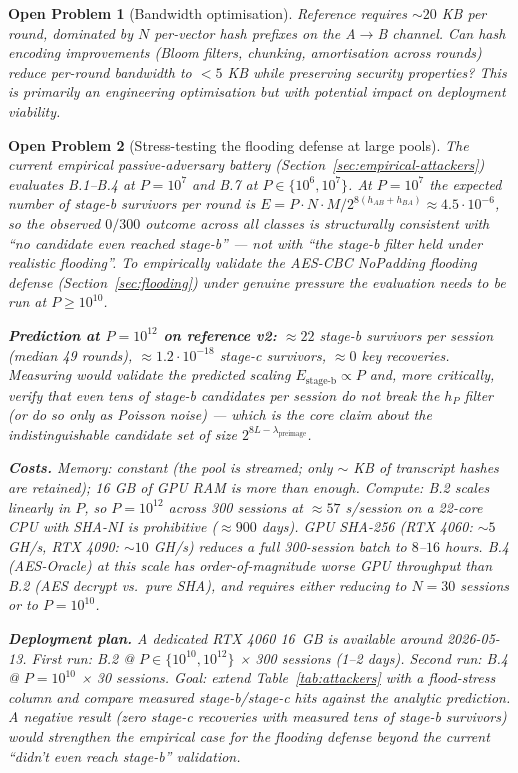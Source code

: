 \documentclass[11pt,a4paper]{article}
\newtheorem{openproblem}{Open Problem}
\begin{document}
\begin{openproblem}[Bandwidth optimisation]\label{prob:bandwidth}
Reference requires $\sim 20$ KB per round, dominated by $N$ per-vector hash prefixes on the A$\to$B channel. Can hash encoding improvements (Bloom filters, chunking, amortisation across rounds) reduce per-round bandwidth to $< 5$ KB while preserving security properties? This is primarily an engineering optimisation but with potential impact on deployment viability.
\end{openproblem}

\begin{openproblem}[Stress-testing the flooding defense at large pools]\label{prob:flood-stress}
The current empirical passive-adversary battery (Section~\ref{sec:empirical-attackers}) evaluates B.1--B.4 at $P = 10^7$ and B.7 at $P \in \{10^6, 10^7\}$. At $P = 10^7$ the expected number of stage-b survivors per round is $E = P \cdot N \cdot M / 2^{8(h_{AB} + h_{BA})} \approx 4{.}5 \cdot 10^{-6}$, so the observed $0/300$ outcome across all classes is structurally consistent with ``no candidate even reached stage-b'' --- not with ``the stage-b filter held under realistic flooding''. To empirically validate the AES-CBC NoPadding flooding defense (Section~\ref{sec:flooding}) under genuine pressure the evaluation needs to be run at $P \geq 10^{10}$.

\textbf{Prediction at $P = 10^{12}$ on reference v2:} $\approx 22$ stage-b survivors per session (median 49 rounds), $\approx 1{.}2 \cdot 10^{-18}$ stage-c survivors, $\approx 0$ key recoveries. Measuring would validate the predicted scaling $E_{\text{stage-b}} \propto P$ and, more critically, verify that even tens of stage-b candidates per session do not break the $h_P$ filter (or do so only as Poisson noise) --- which is the core claim about the indistinguishable candidate set of size $2^{8L - \lambda_{\text{preimage}}}$.

\textbf{Costs.} Memory: constant (the pool is streamed; only $\sim$ KB of transcript hashes are retained); 16 GB of GPU RAM is more than enough. Compute: B.2 scales linearly in $P$, so $P = 10^{12}$ across 300 sessions at $\approx 57$ s/session on a 22-core CPU with SHA-NI is prohibitive ($\approx 900$ days). GPU SHA-256 (RTX 4060: $\sim 5$ GH/s, RTX 4090: $\sim 10$ GH/s) reduces a full 300-session batch to $8$--$16$ hours. B.4 (AES-Oracle) at this scale has order-of-magnitude worse GPU throughput than B.2 (AES decrypt vs.\ pure SHA), and requires either reducing to $N = 30$ sessions or to $P = 10^{10}$.

\textbf{Deployment plan.} A dedicated RTX 4060 16~GB is available around 2026-05-13. First run: B.2 @ $P \in \{10^{10}, 10^{12}\}$ × 300 sessions (1--2 days). Second run: B.4 @ $P = 10^{10}$ × 30 sessions. Goal: extend Table~\ref{tab:attackers} with a flood-stress column and compare measured stage-b/stage-c hits against the analytic prediction. A negative result (zero stage-c recoveries with measured tens of stage-b survivors) would strengthen the empirical case for the flooding defense beyond the current ``didn't even reach stage-b'' validation.
\end{openproblem}
\end{document}
